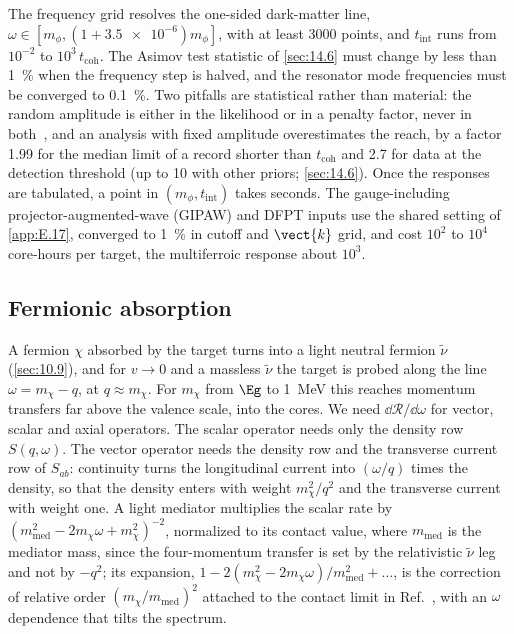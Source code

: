 The frequency grid resolves the one-sided dark-matter line, $\omega \in [m_\phi, (1 + \num{3.5e-6})m_\phi]$, with at least 3000 points, and $t_{\mathrm{int}}$ runs from $10^{-2}$ to $10^3\,t_{\mathrm{coh}}$. The Asimov test statistic of \cref{sec:14.6} must change by less than \SI{1}{\percent} when the frequency step is halved, and the resonator mode frequencies must be converged to \SI{0.1}{\percent}. Two pitfalls are statistical rather than material: the random amplitude is either in the likelihood or in a penalty factor, never in both~\cite{centers2021stochastic}, and an analysis with fixed amplitude overestimates the reach, by a factor 1.99 for the median limit of a record shorter than $t_{\mathrm{coh}}$ and 2.7 for data at the detection threshold (up to 10 with other priors; \cref{sec:14.6}). Once the responses are tabulated, a point in $(m_\phi, t_{\mathrm{int}})$ takes seconds. The gauge-including projector-augmented-wave (GIPAW) and DFPT inputs use the shared setting of \cref{app:E.17}, converged to \SI{1}{\percent} in cutoff and $\vect{k}$ grid, and cost $10^{2}$ to $10^{4}$ core-hours per target, the multiferroic response about $10^{3}$.

\subsection{Fermionic absorption}

A fermion $\chi$ absorbed by the target turns into a light neutral fermion $\tilde\nu$ (\cref{sec:10.9}), and for $v \to 0$ and a massless $\tilde\nu$ the target is probed along the line $\omega = m_\chi - q$, at $q \approx m_\chi$. For $m_\chi$ from $\Eg$ to \SI{1}{MeV} this reaches momentum transfers far above the valence scale, into the cores. We need $\dd\mathcal{R}/\dd\omega$ for vector, scalar and axial operators. The scalar operator needs only the density row $S(q, \omega)$. The vector operator needs the density row and the transverse current row of $S_{ab}$: continuity turns the longitudinal current into $(\omega/q)$ times the density, so that the density enters with weight $m_\chi^2/q^2$ and the transverse current with weight one. A light mediator multiplies the scalar rate by $(m_{\mathrm{med}}^2 - 2m_\chi\omega + m_\chi^2)^{-2}$, normalized to its contact value, where $m_{\mathrm{med}}$ is the mediator mass, since the four-momentum transfer is set by the relativistic $\tilde\nu$ leg and not by $-q^2$; its expansion, $1 - 2(m_\chi^2 - 2m_\chi\omega)/m_{\mathrm{med}}^2 + \dots$, is the correction of relative order $(m_\chi/m_{\mathrm{med}})^2$ attached to the contact limit in Ref.~\cite{cox2024absorption}, with an $\omega$ dependence that tilts the spectrum.

